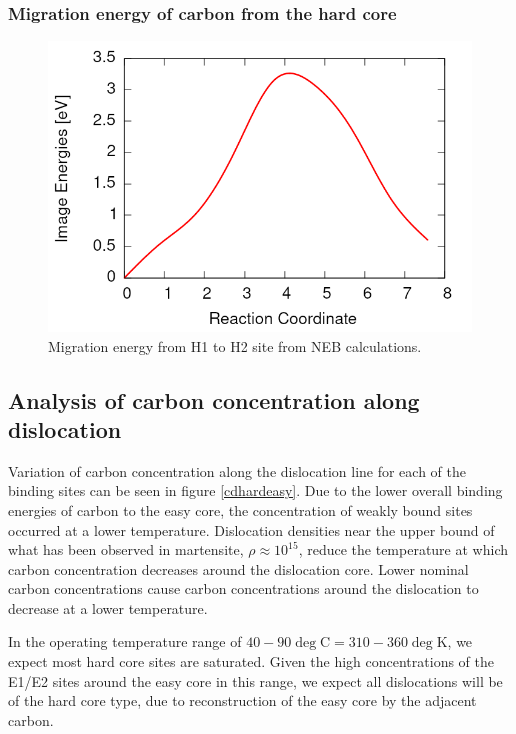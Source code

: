 \documentclass[a4paper,11pt]{article}
\begin{document}
\subsubsection{Migration energy of carbon from the hard core}
\label{sec:org15f241b}

\begin{figure}[htbp]
\centering
\includegraphics[width=.9\linewidth]{Images/H1-H1_migration_energy_barrier.png}
\caption{Migration energy from H1 to H2 site from NEB calculations.}
\end{figure}



\subsection{Analysis of carbon concentration along dislocation}
\label{sec:org3a207b2}

Variation of carbon concentration along the dislocation line for each of the binding sites can be
seen in figure \ref{cdhardeasy}. Due to the lower overall binding energies of carbon to the easy
core, the concentration of weakly bound sites occurred at a lower temperature. Dislocation
densities near the upper bound of what has been observed in martensite, \(\rho \approx10^{15}\), reduce
the temperature at which carbon concentration decreases around the dislocation core. Lower
nominal carbon concentrations cause carbon concentrations around the dislocation to decrease at a
lower temperature.

In the operating temperature range of \(40-90\deg\text{C} = 310-360\deg\text{K}\), we expect most hard
core sites are saturated. Given the high concentrations of the E1/E2 sites around the easy core
in this range, we expect all dislocations will be of the hard core type, due to reconstruction of
the easy core by the adjacent carbon.
\end{document}
